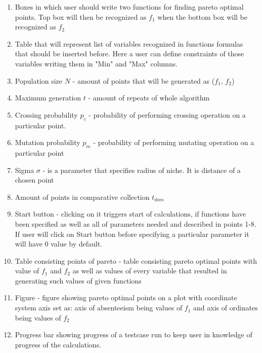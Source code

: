 \documentclass[11pt]{article}
\begin{document}
	\begin{enumerate}
		\item Boxes in which user should write two functions for finding pareto
			optimal points. Top box will then be recognized as $f_{1}$ when the 
			bottom box will be recognized as $f_{2}$
		\item Table that will represent list of variables recognized in functions
			formulas that should be inserted before. Here a user can define 
			constraints of those variables writing them in "Min" and "Max" columns.
		\item Population size $N$ - amount of points that will be generated as
			($f_{1}$, $f_{2}$)
		\item Maximum generation $t$ - amount of repeats of whole algorithm
		\item Crossing probability $p_{c}$ - probability of performing crossing
			operation on a particular point.
		\item Mutation probability $p_{m}$ - probability of performing mutating
			operation on a particular point
		\item Sigma $\sigma$ - is a parameter that specifies radius of niche. It is
			distance of a chosen point 
		\item Amount of points in comparative collection $t_{dom}$
		\item Start button - clicking on it triggers start of calculations, if
			functions have been specified as well as all of parameters needed and
			described in points 1-8. If user will click on Start button before
			specifying a particular parameter it will have $0$ value by default.
		\item Table consisting points of pareto - table consisting pareto optimal
			points with value of $f_{1}$ and $f_{2}$ as well as values of every
			variable that resulted in generating such values of given functions
		\item Figure - figure showing pareto optimal points on a plot with
			coordinate system axis set as: axis of absenteeism being values of
			$f_{1}$ and axis of ordinates being values of $f_{2}$
		\item Progress bar showing progress of a testcase run to keep user in
			knowledge of progress of the calculations.
	\end{enumerate}
			
\end{document}

